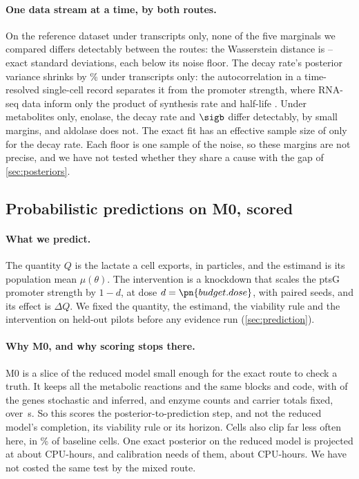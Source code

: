 \paragraph{One data stream at a time, by both routes.} On the reference dataset under transcripts only,
none of the five marginals we compared differs detectably between the routes: the
Wasserstein distance is -- exact standard deviations, each
below its noise floor. The decay rate's posterior variance shrinks by \% under transcripts only:
the autocorrelation in a time-resolved single-cell record separates it from the promoter
strength, where RNA-seq data inform only the product of synthesis rate and half-life \cite{karr2015summary}.
Under metabolites only, enolase, the decay rate and $\sigb$
differ detectably, by small margins, and aldolase does not. The exact fit has an
effective sample size of only  for the decay rate. Each floor is one sample of the
noise, so these margins are not precise, and we have not tested whether they share a
cause with the gap of \cref{sec:posteriors}.

\subsection{Probabilistic predictions on M0, scored}
\label{sec:predm0}

\paragraph{What we predict.} The quantity $Q$ is the lactate a cell exports, in particles, and the estimand is its population
mean $\mu(\theta)$. The intervention is a knockdown that scales the ptsG promoter strength
by $1 - d$, at dose $d = \pn{budget.dose}$, with paired seeds, and its effect is $\Delta Q$. We fixed the quantity, the estimand, the viability rule and the
intervention on held-out pilots before any evidence run (\cref{sec:prediction}).

\paragraph{Why M0, and why scoring stops there.} M0 is a slice of the reduced model small enough for the exact route to check a truth. It keeps all the metabolic reactions and the same blocks and code, with  of the  genes stochastic and inferred, and  enzyme counts and  carrier totals fixed, over \,s. So this scores the posterior-to-prediction step, and not the reduced model's completion, its viability rule or its horizon. Cells also clip far less often here, in \% of baseline cells.
One exact posterior on the reduced model is projected at about 
CPU-hours, and calibration needs  of them, about  CPU-hours. We have not costed the same test by the mixed route.

